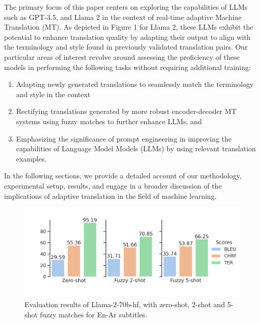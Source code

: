 \documentclass{article}
\begin{document}
The primary focus of this paper centers on exploring the capabilities of LLMs such as GPT-3.5, and Llama 2 in the context of real-time adaptive Machine Translation (MT). As depicted in Figure 1 for Llama 2, these LLMs exhibit the potential to enhance translation quality by adapting their output to align with the terminology and style found in previously validated translation pairs. Our particular areas of interest revolve around assessing the proficiency of these models in performing the following tasks without requiring additional training:


\begin{enumerate}
	\item Adapting newly generated translations to seamlessly match the terminology and style in the context
	
	\item Rectifying translations generated by more robust encoder-decoder MT systems using fuzzy matches to further enhance LLMs, and
	
	\item Emphasizing the significance of prompt engineering in improving the capabilities of Language Model Models (LLMs) by using relevant translation examples. 
	
\end{enumerate}

In the following sections, we provide a detailed account of our methodology, experimental setup, results, and engage in a broader discussion of the implications of adaptive translation in the field of machine learning. 

\begin{figure}
	\centering
	\includegraphics[width=\linewidth, ]{figs/Llama2_evaluation} %
	\caption{ Evaluation results of Llama-2-70b-hf, with zero-shot, 2-shot and 5-shot fuzzy matches for En-Ar subtitles.}
	
	\label{llama_2_evaluation:duck}
\end{figure}
\end{document}
